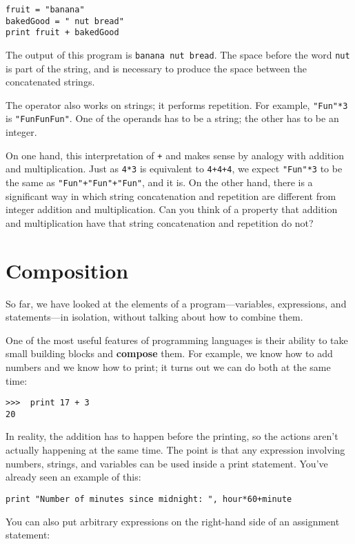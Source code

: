 
\beforeverb
\begin{verbatim}
fruit = "banana"
bakedGood = " nut bread"
print fruit + bakedGood
\end{verbatim}
\afterverb
%
The output of this program is {\tt banana nut bread}.  The space
before the word {\tt nut} is part of the string, and is necessary
to produce the space between the concatenated strings.

The {\tt *} operator also works on strings; it performs repetition.
For example, {\tt "Fun"*3} is {\tt "FunFunFun"}.  One of the operands
has to be a string; the other has to be an integer.

On one hand, this interpretation of {\tt +} and {\tt *} makes sense by
analogy with addition and multiplication.  Just as {\tt 4*3} is
equivalent to {\tt 4+4+4}, we expect {\tt "Fun"*3} to be the same as
{\tt "Fun"+"Fun"+"Fun"}, and it is.  On the other hand, there is a
significant way in which string concatenation and repetition are
different from integer addition and multiplication.
Can you think of a property that addition and multiplication have
that string concatenation and repetition do not?


\section{Composition}

So far, we have looked at the elements of a program---variables,
expressions, and statements---in isolation, without talking about how to
combine them.

One of the most useful features of programming languages is their
ability to take small building blocks and {\bf compose} them.  For
example, we know how to add numbers and we know how to print; it turns
out we can do both at the same time:

\beforeverb
\begin{verbatim}
>>>  print 17 + 3
20
\end{verbatim}
\afterverb
%
In reality, the
addition has to happen before the printing, so the actions aren't 
actually happening at the same time. The point is that any
expression involving numbers, strings, and variables can be used inside a
print statement.  You've already seen an example of this:

\beforeverb
\begin{verbatim}
print "Number of minutes since midnight: ", hour*60+minute
\end{verbatim}
\afterverb
%
You can also put arbitrary expressions on the right-hand side of an
assignment statement:

